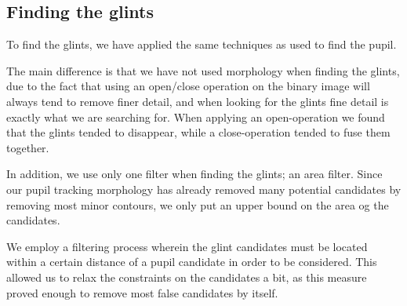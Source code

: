 \subsection{Finding the glints}
To find the glints, we have applied the same techniques as used to find the pupil.\newline

The main difference is that we have not used morphology when finding the glints, due to the fact that using an open/close operation on the binary image will always tend to remove finer detail, and when looking for the glints fine detail is exactly what we are searching for. When applying an open-operation we found that the glints tended to disappear, while a close-operation tended to fuse them together.\newline

In addition, we use only one filter when finding the glints; an area filter. Since our pupil tracking morphology has already removed many potential candidates by removing most minor contours, we only put an upper bound on the area og the candidates.

We employ a filtering process wherein the glint candidates must be located within a certain distance of a pupil candidate in order to be considered. This allowed us to relax the constraints on the candidates a bit, as this measure proved enough to remove most false candidates by itself.